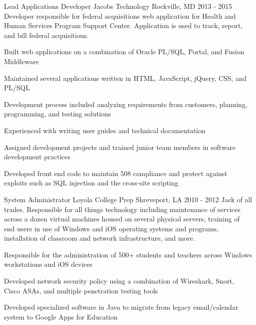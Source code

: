 \begin{cventries}
  \cventrysix
    {Lead Applications Developer} %
    {Jacobs Technology} %
    {Rockville, MD} %
    {2013 - 2015} %
    {Developer responsible for federal acquisitions web application for Health and Human Services Program Support Center. Application is used to track, report, and bill federal acquisitions.} %
    {
      \begin{cvitems} %
        \item {Built web applications on a combination of Oracle PL/SQL, Portal, and Fusion Middleware}
        \item {Maintained several applications written in HTML, JavaScript, jQuery, CSS, and PL/SQL}
        \item {Development process included analyzing requirements from customers, planning, programming, and testing solutions}
        \item {Experienced with writing user guides and technical documentation}
        \item {Assigned development projects and trained junior team members in software development practices}
        \item {Developed front end code to maintain 508 compliance and protect against exploits such as SQL injection and the cross-site scripting}
      \end{cvitems}
    }

  \cventrysix
    {System Administrator} %
    {Loyola College Prep} %
    {Shreveport, LA} %
    {2010 - 2012} %
    {Jack of all trades.  Responsible for all things technology including maintenance of services across a dozen virtual machines housed on several physical servers, training of end users in use of Windows and iOS operating systems and programs, installation of classroom and network infrastructure, and more.} %
    {
      \begin{cvitems} %
        \item {Responsible for the administration of 500+ students and teachers across Windows workstations and iOS devices}
        \item {Developed network security policy using a combination of Wireshark, Snort, Cisco ASAs, and multiple penetration testing tools}
        \item {Developed specialized software in Java to migrate from legacy email/calendar system to Google Apps for Education}
      \end{cvitems}
    }

\end{cventries}
